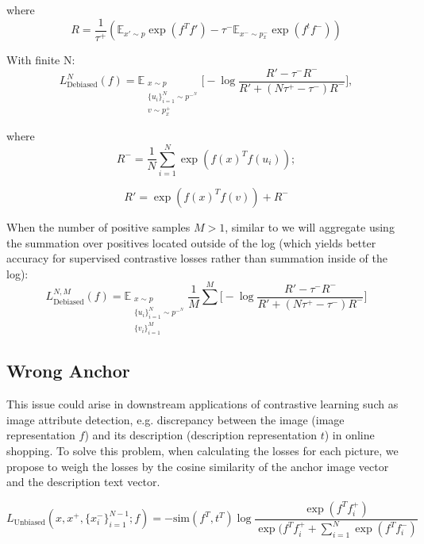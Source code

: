 \documentclass{article}
\begin{document}
where
\begin{equation}
R = \frac{1}{\tau^+} (\mathbb{E}_{x' \sim p} \exp(f^Tf') - \tau^- \mathbb{E}_{x^- \sim p_x^-} \exp(f^tf^-))
\end{equation}

With finite N:
\begin{equation} \label{eq:5}
L_{\text{Debiased}}^N (f) = \mathbb{E}_{\substack{x \sim p \\ \{u_i\}_{i=1}^N \sim p^-^N \\ v \sim p_x^+}} \bigg[-\log \frac{R' - \tau^- R^-}{R' + (N \tau^+ - \tau^-) R^-}\bigg],
\end{equation}

where
\begin{equation}
R^-= \frac{1}{N} \sum\limits_{i=1}^N \exp(f(x)^Tf(u_i));
\end{equation}

\begin{equation}
R' = \exp(f(x)^T f(v)) + R^-
\end{equation}

When the number of positive samples $M > 1$, similar to \citep{khosla2021supervised} we will aggregate using the summation over positives located outside of the log (which yields better accuracy for supervised contrastive losses rather than summation inside of the log):
\begin{equation}
L_{\text{Debiased}}^{N, M} (f) = \mathbb{E}_{\substack{x \sim p \\ \{u_i\}_{i=1}^N \sim p^-^N \\ \{v_i\}_{i=1}^M}} \frac{1}{M} \sum\limits^M \bigg[-\log \frac{R' - \tau^- R^-}{R' + (N \tau^+ - \tau^-) R^-}\bigg]
\end{equation}

\subsection{Wrong Anchor}
This issue could arise in downstream applications of contrastive learning such as image attribute detection, e.g. discrepancy between the image (image representation $f$) and its description (description representation $t$) in online shopping. To solve this problem, when calculating the losses for each picture, we propose to weigh the losses by the cosine similarity of the anchor image vector and the description text vector.

\begin{equation}
L_{\text{Unbiased}}(x, x^+, \{x_i^-\}_{i=1}^{N-1}; f) = - \text{sim} (f^T, t^T) \log \frac{\exp(f^T f_i^+)}{\exp(f^T f_i^+ + \sum_{i=1}^N \exp(f^T f_i^-)}
\end{equation}
\end{document}
